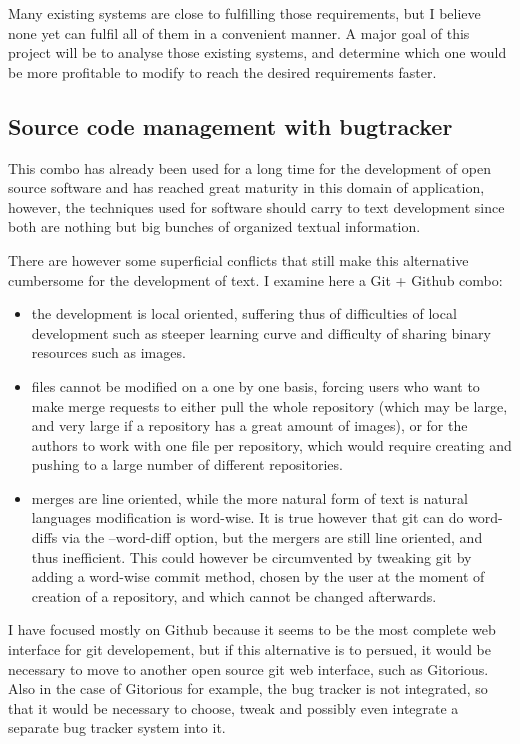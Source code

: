 \documentclass[12pt]{article}
\begin{document}
Many existing systems are close to fulfilling those requirements, but I believe none yet can fulfil all of them in a convenient manner. A major goal of this project will be to analyse those existing systems, and determine which one would be more profitable to modify to reach the desired requirements faster.

\subsection{Source code management with bugtracker}

This combo has already been used for a long time for the development of open source software and has reached great maturity in this domain of application, however, the techniques used for software should carry to text development since both are nothing but big bunches of organized textual information.

There are however some superficial conflicts that still make this alternative cumbersome for the development of text. I examine here a Git + Github combo:

\begin{itemize}
  \item the development is local oriented, suffering thus of difficulties of local development such as steeper learning curve and difficulty of sharing binary resources such as images.
  
  \item files cannot be modified on a one by one basis, forcing users who want to make merge requests to either pull the whole repository (which may be large, and very large if a repository has a great amount of images), or for the authors to work with one file per repository, which would require creating and pushing to a large number of different repositories.
  
  \item merges are line oriented, while the more natural form of text is natural languages modification is word-wise. It is true however that git can do word-diffs via the --word-diff option, but the mergers are still line oriented, and thus inefficient. This could however be circumvented by tweaking git by adding a word-wise commit method, chosen by the user at the moment of creation of a repository, and which cannot be changed afterwards.
\end{itemize}

I have focused mostly on Github because it seems to be the most complete web interface for git developement, but if this alternative is to persued, it would be necessary to move to another open source git web interface, such as Gitorious. Also in the case of Gitorious for example, the bug tracker is not integrated, so that it would be necessary to choose, tweak and possibly even integrate a separate bug tracker system into it.
\end{document}
